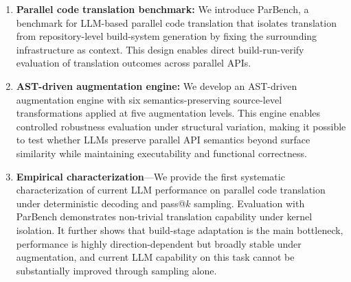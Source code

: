 \documentclass{article}
\begin{document}
\begin{enumerate}

\item \textbf{Parallel code translation benchmark:} We introduce ParBench, a benchmark for LLM-based parallel code translation that isolates translation from repository-level build-system generation by fixing the surrounding infrastructure as context. This design enables direct build-run-verify evaluation of translation outcomes across parallel APIs.

\item \textbf{AST-driven augmentation engine:} We develop an AST-driven augmentation engine with six semantics-preserving source-level transformations applied at five augmentation levels. This engine enables controlled robustness evaluation under structural variation, making it possible to test whether LLMs preserve parallel API semantics beyond surface similarity while maintaining executability and functional correctness.


\item \textbf{Empirical characterization}---We provide the first systematic characterization of current LLM performance on parallel code translation under deterministic decoding and pass@$k$ sampling. Evaluation with ParBench demonstrates non-trivial translation capability under kernel isolation. It further shows that build-stage adaptation is the main bottleneck, performance is highly direction-dependent but broadly stable under augmentation, and current LLM capability on this task cannot be substantially improved through sampling alone.
\end{enumerate}



\end{document}

